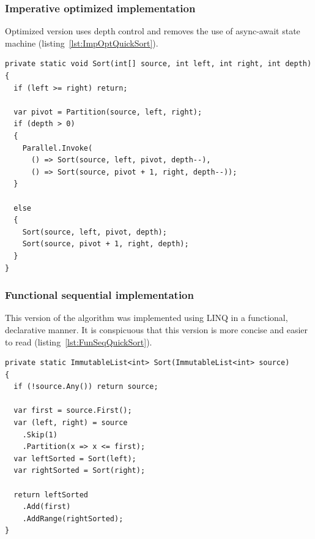 \subsubsection{Imperative optimized implementation}
Optimized version uses depth control and removes the use of async-await state machine (listing~\ref{lst:ImpOptQuickSort}).
\begin{lstlisting}[language={[sharp]c}, style=sharpcstyle, caption={Imperative optimized \texttt{quicksort}}, label={lst:ImpOptQuickSort},
numbers=none, xleftmargin=0pt,framexleftmargin=0pt,framexrightmargin=0pt,framexbottommargin=0pt]
private static void Sort(int[] source, int left, int right, int depth)
{
  if (left >= right) return;

  var pivot = Partition(source, left, right);
  if (depth > 0)
  {
    Parallel.Invoke(
      () => Sort(source, left, pivot, depth--),
      () => Sort(source, pivot + 1, right, depth--));
  }

  else
  {
    Sort(source, left, pivot, depth);
    Sort(source, pivot + 1, right, depth);
  }
}
\end{lstlisting}

\subsubsection{Functional sequential implementation}
This version of the algorithm was implemented using LINQ in a functional, declarative manner. It is conspicuous that this version is more concise and easier to read (listing~\ref{lst:FunSeqQuickSort}).
\begin{lstlisting}[language={[sharp]c}, style=sharpcstyle, caption={Functional sequential \texttt{quicksort} implementation}, label={lst:FunSeqQuickSort},
numbers=none, xleftmargin=0pt,framexleftmargin=0pt,framexrightmargin=0pt,framexbottommargin=0pt]
private static ImmutableList<int> Sort(ImmutableList<int> source)
{
  if (!source.Any()) return source;

  var first = source.First();
  var (left, right) = source
    .Skip(1)
    .Partition(x => x <= first);
  var leftSorted = Sort(left);
  var rightSorted = Sort(right);

  return leftSorted
    .Add(first)
    .AddRange(rightSorted);
}
\end{lstlisting}

